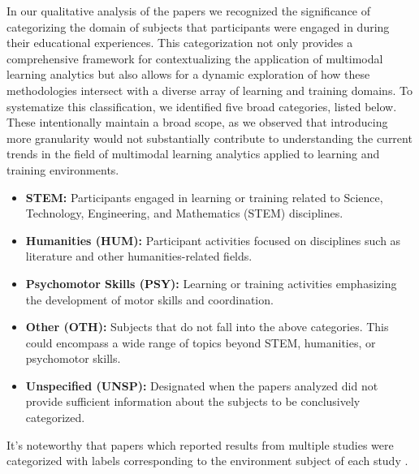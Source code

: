 \documentclass[manuscript,screen,review]{acmart}
\begin{document}
In our qualitative analysis of the papers we recognized the significance of categorizing the domain of subjects that participants were engaged in during their educational experiences. This categorization not only provides a comprehensive framework for contextualizing the application of multimodal learning analytics but also allows for a dynamic exploration of how these methodologies intersect with a diverse array of learning and training domains. To systematize this classification, we identified five broad categories, listed below. These intentionally maintain a broad scope, as we observed that introducing more granularity would not substantially contribute to understanding the current trends in the field of multimodal learning analytics applied to learning and training environments.
\begin{itemize}
    \item \textbf{STEM:} Participants engaged in learning or training related to Science, Technology, Engineering, and Mathematics (STEM) disciplines.
    \item \textbf{Humanities (HUM):} Participant activities focused on disciplines such as literature and other humanities-related fields.
    \item \textbf{Psychomotor Skills (PSY):}  Learning or training activities emphasizing the development of motor skills and coordination.
    \item \textbf{Other (OTH):} Subjects that do not fall into the above categories. This could encompass a wide range of topics beyond STEM, humanities, or psychomotor skills.
    \item \textbf{Unspecified (UNSP):} Designated when the papers analyzed did not provide sufficient information about the subjects to be conclusively categorized.
\end{itemize}

It's noteworthy that papers which reported results from multiple studies were categorized with labels corresponding to the environment subject of each study \cite{3796643912,2055153191}. 
\end{document}
